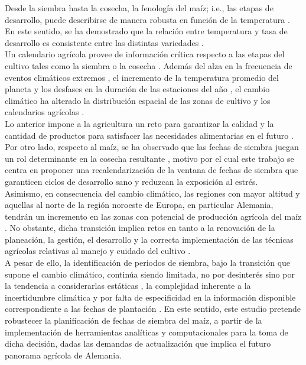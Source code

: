 Desde la siembra hasta la cosecha, la fenología del maíz; i.e., las etapas de desarrollo, puede describirse de manera robusta en función de la  temperatura \cite{Liu_2025}. En este sentido, se ha demostrado que la relación entre temperatura y tasa de desarrollo es consistente entre las distintas variedades \cite{Parent_2012}.\\

Un calendario agrícola provee de información crítica respecto a las etapas del cultivo tales como la siembra o la cosecha \cite{Franch_2022}. Además del alza en la frecuencia de eventos climáticos extremos \cite{MIRON_2023}, el incremento de la temperatura promedio del planeta \cite{Shivanna_2022} y los desfases en la duración de las estaciones del año \cite{Wang_2014}, el cambio climático ha alterado la distribución espacial de las zonas de cultivo \cite{SU_2023} y los calendarios agrícolas \cite{Franch_2022}.\\


Lo anterior impone a la agricultura un reto para garantizar la calidad y la cantidad de productos para satisfacer las necesidades alimentarias en el futuro \cite{MIRON_2023}. Por otro lado, respecto al maíz, se ha observado que las fechas de siembra juegan un rol determinante en la cosecha resultante \cite{Baum_2019, BernalMorales_2025, Long_2017, Mason_2018, Parker_2016, Sacks_2011}, motivo por el cual este trabajo se centra en proponer una recalendarización de la ventana de fechas de siembra que garanticen ciclos de desarrollo sano y reduzcan la exposición al estrés. \\


Asimismo, en consecuencia del cambio climático, las regiones con mayor altitud y aquellas al norte de la región noroeste de Europa, en particular Alemania, tendrán un incremento en las zonas con potencial de producción agrícola del maíz \cite{Miedaner_2021}. No obstante, dicha transición implica retos en tanto a la renovación de la planeación, la gestión, el desarrollo y la correcta implementación de las técnicas agrícolas relativas al manejo y cuidado del cultivo \cite{Parent_2018, DONMEZ_2023}.\\


A pesar de ello, la identificación de periodos de siembra, bajo la transición que supone el cambio climático, continúa siendo limitada, no por desinterés sino por la tendencia a considerarlas estáticas \cite{Parker_2016}, la complejidad inherente a la incertidumbre climática \cite{Waha_2011} y por falta de especificidad en la información disponible correspondiente a las fechas de plantación  \cite{Portmann_2010, Sacks_2010}. En este sentido, este estudio pretende robustecer la planificación de fechas de siembra del maíz, a partir de la implementación de herramientas analíticas y computacionales para la toma de dicha decisión, dadas las demandas de actualización que implica el futuro panorama agrícola de Alemania.\\

